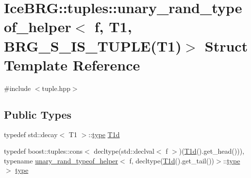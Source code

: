 \hypertarget{structIceBRG_1_1tuples_1_1unary__rand__typeof__helper_3_01f_00_01T1_00_01BRG__S__IS__TUPLE_07T1_08_4}{}\section{Ice\+B\+R\+G\+:\+:tuples\+:\+:unary\+\_\+rand\+\_\+typeof\+\_\+helper$<$ f, T1, B\+R\+G\+\_\+\+S\+\_\+\+I\+S\+\_\+\+T\+U\+P\+L\+E(T1)$>$ Struct Template Reference}
\label{structIceBRG_1_1tuples_1_1unary__rand__typeof__helper_3_01f_00_01T1_00_01BRG__S__IS__TUPLE_07T1_08_4}


{\ttfamily \#include $<$tuple.\+hpp$>$}

\subsection*{Public Types}
\begin{DoxyCompactItemize}
\item 
typedef std\+::decay$<$ T1 $>$\+::\hyperlink{structIceBRG_1_1tuples_1_1unary__rand__typeof__helper_3_01f_00_01T1_00_01BRG__S__IS__TUPLE_07T1_08_4_a1936e83b3ef0820a319846b7c3f3b9a6}{type} \hyperlink{structIceBRG_1_1tuples_1_1unary__rand__typeof__helper_3_01f_00_01T1_00_01BRG__S__IS__TUPLE_07T1_08_4_ac47636122d9eb47f1b4b42e03d2ca3ad}{T1d}
\item 
typedef boost\+::tuples\+::cons$<$ decltype(std\+::declval$<$ f $>$)(\hyperlink{structIceBRG_1_1tuples_1_1unary__rand__typeof__helper_3_01f_00_01T1_00_01BRG__S__IS__TUPLE_07T1_08_4_ac47636122d9eb47f1b4b42e03d2ca3ad}{T1d}().get\+\_\+head())), typename \hyperlink{namespaceIceBRG_1_1tuples_structIceBRG_1_1tuples_1_1unary__rand__typeof__helper}{unary\+\_\+rand\+\_\+typeof\+\_\+helper}$<$ f, decltype(\hyperlink{structIceBRG_1_1tuples_1_1unary__rand__typeof__helper_3_01f_00_01T1_00_01BRG__S__IS__TUPLE_07T1_08_4_ac47636122d9eb47f1b4b42e03d2ca3ad}{T1d}().get\+\_\+tail())$>$\+::\hyperlink{structIceBRG_1_1tuples_1_1unary__rand__typeof__helper_3_01f_00_01T1_00_01BRG__S__IS__TUPLE_07T1_08_4_a1936e83b3ef0820a319846b7c3f3b9a6}{type} $>$ \hyperlink{structIceBRG_1_1tuples_1_1unary__rand__typeof__helper_3_01f_00_01T1_00_01BRG__S__IS__TUPLE_07T1_08_4_a1936e83b3ef0820a319846b7c3f3b9a6}{type}
\end{DoxyCompactItemize}



